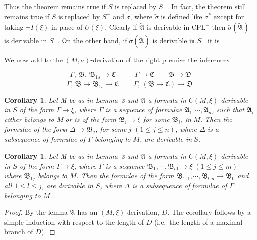 \documentclass[12pt,a4paper]{article}
\newtheorem{corollary}[lemma]{Corollary}
\begin{document}
\noindent
Thus the theorem remains true if $S$ is replaced by $S^-$. In fact, the
theorem still remains true if $S$ is replaced by $S^-$ and $\sigma$, where
$\tilde{\sigma}$ is defined like $\sigma^*$ except for taking
$\neg I(\xi)$ in place of $U(\xi)$. Clearly if $\tilde{\mathfrak{A}}$ is
derivable in $\mathrm{CPL}^-$ then $\tilde{\sigma}(\tilde{\mathfrak{A}})$ is
derivable in $S^-$. On the other hand, if $\tilde{\sigma}(\tilde{\mathfrak{A}})$
is derivable in $S^-$ it is

\bigskip
\noindent
We now add to the $(M,a)$-derivation of the right premise the inferences

\[
\dfrac{\Gamma,\,\mathfrak{B},\,\mathfrak{B}_{1s} \to \mathfrak{C}}
      {\Gamma,\,\mathfrak{B} \to \mathfrak{B}_{1s} \to \mathfrak{C}}
\qquad
\dfrac{\Gamma \to \mathfrak{C}\qquad\mathfrak{B} \to \mathfrak{D}}
      {\Gamma,\,(\mathfrak{B} \to \mathfrak{C}) \to \mathfrak{D}}
\]

\begin{corollary}
Let $M$ be as in Lemma~3 and $\mathfrak{A}$ a formula in $C(M,\xi)$
derivable in $S$ of the form $\Gamma \to \xi$, where $\Gamma$ is a sequence
of formulae $\mathfrak{A}_1, \cdots, \mathfrak{A}_n$, such that
$\mathfrak{A}_i$ either belongs to $M$ or is of the form
$\mathfrak{B}_i \to \xi$ for some $\mathfrak{B}_i$, in $M$. Then the
formulae of the form $\Delta \to \mathfrak{B}_j$, for some $j$
$(1 \le j \le n)$, where $\Delta$ is a subsequence of formulae of $\Gamma$
belonging to $M$, are derivable in $S$.
\end{corollary}

\begin{corollary}
Let $M$ be as in Lemma~3 and $\mathfrak{A}$ a formula in $C(M,\xi)$
derivable in $S$ of the form $\Gamma \to \xi$, where $\Gamma$ is a sequence
$\mathfrak{B}_1, \cdots, \mathfrak{B}_{l0} \to \xi$ $(1 \le j \le m)$
where $\mathfrak{B}_{1j}$ belongs to $M$. Then the formulae of the form
$\mathfrak{B}_{1,1}, \cdots, \mathfrak{B}_{l,n} \to \mathfrak{B}_{0}$ and
all $1 \le l \le j$, are derivable in $S$, where $\Delta$ is a subsequence
of formulae of $\Gamma$ belonging to $M$.
\end{corollary}

\begin{proof}
By the lemma $\mathfrak{A}$ has an $(M,\xi)$-derivation, $D$. The corollary
follows by a simple induction with respect to the length of $D$ (i.e.\ the
length of a maximal branch of $D$).
\end{proof}
\end{document}
